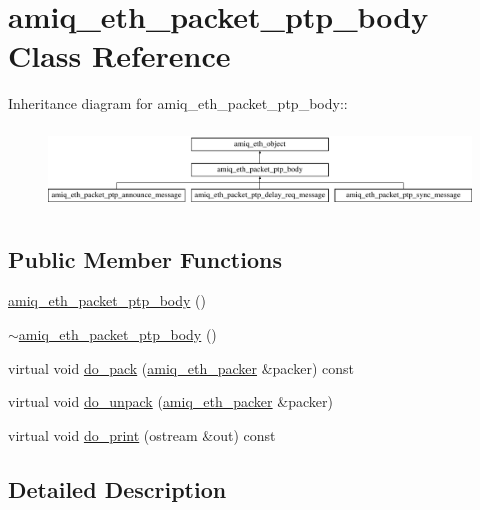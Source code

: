 \hypertarget{classamiq__eth__packet__ptp__body}{
\section{amiq\_\-eth\_\-packet\_\-ptp\_\-body Class Reference}
\label{classamiq__eth__packet__ptp__body}
}
Inheritance diagram for amiq\_\-eth\_\-packet\_\-ptp\_\-body::\begin{figure}[H]
\begin{center}
\leavevmode
\includegraphics[height=2.1875cm]{classamiq__eth__packet__ptp__body}
\end{center}
\end{figure}
\subsection*{Public Member Functions}
\begin{DoxyCompactItemize}
\item 
\hyperlink{classamiq__eth__packet__ptp__body_a9bc5473367cced49e72242ea64262c52}{amiq\_\-eth\_\-packet\_\-ptp\_\-body} ()
\item 
\hyperlink{classamiq__eth__packet__ptp__body_a6fe39e892a2b0b45c7b5046c858bff07}{$\sim$amiq\_\-eth\_\-packet\_\-ptp\_\-body} ()
\item 
virtual void \hyperlink{classamiq__eth__packet__ptp__body_a3df3ad9b3a4ef7ec42357565d44ede05}{do\_\-pack} (\hyperlink{classamiq__eth__packer}{amiq\_\-eth\_\-packer} \&packer) const 
\item 
virtual void \hyperlink{classamiq__eth__packet__ptp__body_a17a10ad537b6553f35b54d2f037d4f0d}{do\_\-unpack} (\hyperlink{classamiq__eth__packer}{amiq\_\-eth\_\-packer} \&packer)
\item 
virtual void \hyperlink{classamiq__eth__packet__ptp__body_a44ff8df4c84f236f8bab792ceb338e6a}{do\_\-print} (ostream \&out) const 
\end{DoxyCompactItemize}


\subsection{Detailed Description}



